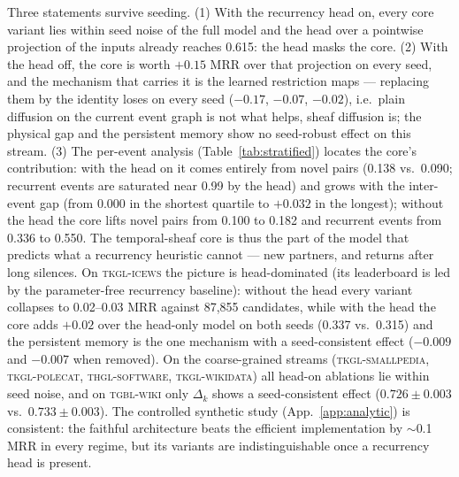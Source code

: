 Three statements survive seeding. (1) With the recurrency head on, every
core variant lies within seed noise of the full model and the head over a
pointwise projection of the inputs already reaches 0.615: the head masks
the core. (2) With the head off, the core is worth $+0.15$ MRR over that
projection on every seed, and the mechanism that carries it is the learned
restriction maps --- replacing them by the identity loses on every seed
($-0.17$, $-0.07$, $-0.02$), i.e.\ plain diffusion on the current event
graph is not what helps, sheaf diffusion is; the physical gap and the
persistent memory show no seed-robust effect on this stream. (3) The
per-event analysis (Table~\ref{tab:stratified}) locates the core's
contribution: with the head on it comes entirely from novel pairs
(0.138 vs.\ 0.090; recurrent events are saturated near 0.99 by the head) and
grows with the inter-event gap (from $0.000$ in the shortest quartile to
$+0.032$ in the longest); without the head the core lifts novel pairs from
0.100 to 0.182 and recurrent events from 0.336 to 0.550. The temporal-sheaf
core is thus the part of the model that predicts what a recurrency
heuristic cannot --- new partners, and returns after long silences.
On \textsc{tkgl-icews} the picture is head-dominated (its leaderboard is
led by the parameter-free recurrency baseline): without the head every
variant collapses to 0.02--0.03 MRR against 87,855 candidates, while with
the head the core adds $+0.02$ over the head-only model on both seeds
(0.337 vs.\ 0.315)
and the persistent memory is the one mechanism with a seed-consistent
effect ($-0.009$ and $-0.007$ when removed). On the coarse-grained streams
(\textsc{tkgl-smallpedia}, \textsc{tkgl-polecat}, \textsc{thgl-software},
\textsc{tkgl-wikidata}) all head-on ablations lie within seed noise, and on
\textsc{tgbl-wiki} only $\Delta_k$ shows a seed-consistent effect
($0.726 \pm 0.003$ vs.\ $0.733 \pm 0.003$). The controlled synthetic study
(App.~\ref{app:analytic}) is consistent: the faithful architecture beats the
efficient implementation by $\sim$0.1 MRR in every regime, but its variants
are indistinguishable once a recurrency head is present.
